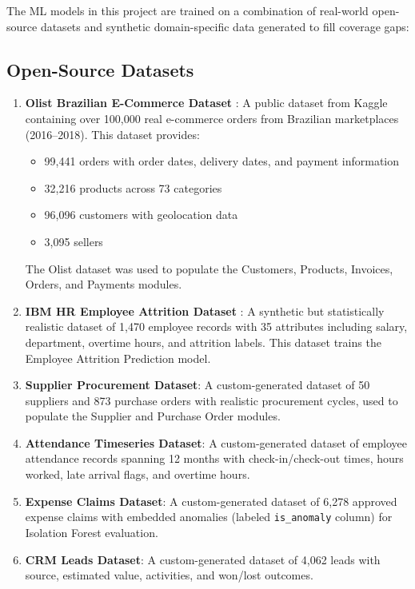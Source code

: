 \documentclass[12pt,a4paper]{report}
\begin{document}
The ML models in this project are trained on a combination of real-world open-source datasets and synthetic domain-specific data generated to fill coverage gaps:

\subsection{Open-Source Datasets}

\begin{enumerate}[label=\arabic*.]
  \item \textbf{Olist Brazilian E-Commerce Dataset} \citep{olist2018}: A public dataset from Kaggle containing over 100,000 real e-commerce orders from Brazilian marketplaces (2016--2018). This dataset provides:
  \begin{itemize}
    \item 99,441 orders with order dates, delivery dates, and payment information
    \item 32,216 products across 73 categories
    \item 96,096 customers with geolocation data
    \item 3,095 sellers
  \end{itemize}
  The Olist dataset was used to populate the Customers, Products, Invoices, Orders, and Payments modules.

  \item \textbf{IBM HR Employee Attrition Dataset} \citep{ibm2017hr}: A synthetic but statistically realistic dataset of 1,470 employee records with 35 attributes including salary, department, overtime hours, and attrition labels. This dataset trains the Employee Attrition Prediction model.

  \item \textbf{Supplier Procurement Dataset}: A custom-generated dataset of 50 suppliers and 873 purchase orders with realistic procurement cycles, used to populate the Supplier and Purchase Order modules.

  \item \textbf{Attendance Timeseries Dataset}: A custom-generated dataset of employee attendance records spanning 12 months with check-in/check-out times, hours worked, late arrival flags, and overtime hours.

  \item \textbf{Expense Claims Dataset}: A custom-generated dataset of 6,278 approved expense claims with embedded anomalies (labeled \texttt{is\_anomaly} column) for Isolation Forest evaluation.

  \item \textbf{CRM Leads Dataset}: A custom-generated dataset of 4,062 leads with source, estimated value, activities, and won/lost outcomes.
\end{enumerate}
\end{document}
